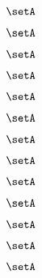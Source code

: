 \begin{forslides}
    \begin{equation}
        \label{eq:slides-processes-145}
        \setA
    \end{equation}

    \begin{equation}
        \label{eq:slides-processes-146}
        \setA
    \end{equation}

    \begin{equation}
        \label{eq:slides-processes-147}
        \setA
    \end{equation}

    \begin{equation}
        \label{eq:slides-processes-148}
        \setA
    \end{equation}

    \begin{equation}
        \label{eq:slides-processes-149}
        \setA
    \end{equation}
    
    \begin{equation}
        \label{eq:slides-processes-150}
        \setA
    \end{equation}

    \begin{equation}
        \label{eq:slides-processes-151}
        \setA
    \end{equation}

    \begin{equation}
        \label{eq:slides-processes-152}
        \setA
    \end{equation}

    \begin{equation}
        \label{eq:slides-processes-153}
        \setA
    \end{equation}

    \begin{equation}
        \label{eq:slides-processes-154}
        \setA
    \end{equation}

    \begin{equation}
        \label{eq:slides-processes-155}
        \setA
    \end{equation}

    \begin{equation}
        \label{eq:slides-processes-156}
        \setA
    \end{equation}

    \begin{equation}
        \label{eq:slides-processes-157}
        \setA
    \end{equation}


\end{forslides}
